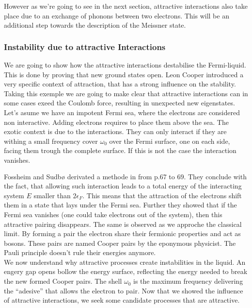 \documentclass[../main.tex]{subfile}
\begin{document}
However as we're going to see in the next section, attractive interactions also take place due to an exchange of phonons between two electrons. This will be 
an additional step towards the description of the Meissner state.

\subsubsection{Instability due to attractive Interactions}
We are going to show how the attractive interactions destabilise the Fermi-liquid. This is done by proving
that new ground states open. Leon Cooper introduced a very specific context of attraction, that has a strong influence on the stability. Taking this exemple we are going
to make clear that attractive interactions can in some cases exeed the Coulomb force, resulting in unexpected new eigenstates.\\

Let's asume we have an impotent Fermi sea, where the electrons are considered non interactive. Adding electrons requires to place them
above the sea. The exotic context is due to the interactions. They can only interact if they are withing a small frequency cover $\omega_0$
over the Fermi surface, one on each side, facing them trough the complete surface. If this is not the case the interaction vanishes.

Fossheim and Sudbø derivated a methode in \cite{FossheimSudbo2004} from p.67 to 69. They conclude with the fact, that allowing such
interaction leads to a total energy of the interacting system $E$ smaller than $2 \epsilon_{F}$. This means that the attraction of the electrons
shift them in a state that lays under the Fermi sea. Further they showed that if the Fermi sea vanishes (one could take electrons out of the system), 
then this attractive pairing disappears. The same is observed as we approche the classical limit.
By forming a pair the electron share their fermionic properties and act as bosons. These pairs are named Cooper pairs by the eponymous physicist.
The Pauli principle doesn't rule their energies anymore.\\

We now understand why attractive processes create instabilities in the liquid. An engery gap opens bollow the energy surface,
reflecting the energy needed to break the new formed Cooper pairs. The shell $\omega_0$ is the maximum frequency delivering
the ``adesive'' that allows the electron to pair.
Now that we showed the influence of attractive interactions, we seek some candidate processes that are attractive.
\end{document}
